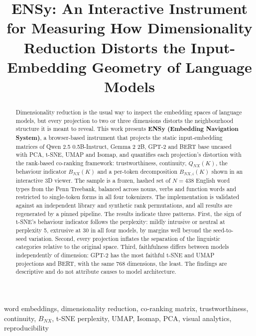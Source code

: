 \documentclass[conference,a4paper]{IEEEtran}
\begin{document}
\title{ENSy: An Interactive Instrument for Measuring How Dimensionality
Reduction Distorts the Input-Embedding Geometry of Language Models}
\author{
}
\maketitle

\begin{abstract}
Dimensionality reduction is the usual way to inspect the embedding
spaces of language models, but every projection to two or three
dimensions distorts the neighbourhood structure it is meant to reveal.
This work presents \textbf{ENSy (Embedding Navigation System)}, a
browser-based instrument that projects the static input-embedding
matrices of Qwen 2.5 0.5B-Instruct, Gemma 2 2B, GPT-2 and BERT base
uncased with PCA, t-SNE, UMAP and Isomap, and quantifies each
projection's distortion with the rank-based co-ranking framework:
trustworthiness, continuity, \(Q_{NX}(K)\), the behaviour indicator
\(B_{NX}(K)\) and a per-token decomposition \(B_{NX,i}(K)\) shown in an
interactive 3D viewer. The sample is a frozen, hashed set of \(N=438\)
English word types from the Penn Treebank, balanced across nouns, verbs
and function words and restricted to single-token forms in all four
tokenizers. The implementation is validated against an independent
library and synthetic rank permutations, and all results are regenerated
by a pinned pipeline. The results indicate three patterns. First, the
sign of t-SNE's behaviour indicator follows the perplexity: mildly
intrusive or neutral at perplexity 5, extrusive at 30 in all four
models, by margins well beyond the seed-to-seed variation. Second, every
projection inflates the separation of the linguistic categories relative
to the original space. Third, faithfulness differs between models
independently of dimension: GPT-2 has the most faithful t-SNE and UMAP
projections and BERT, with the same 768 dimensions, the least. The
findings are descriptive and do not attribute causes to model
architecture.
\end{abstract}
\begin{IEEEkeywords}
word embeddings, dimensionality reduction, co-ranking matrix,
trustworthiness, continuity, \(B_{NX}\), t-SNE perplexity, UMAP, Isomap,
PCA, visual analytics, reproducibility
\end{IEEEkeywords}
\end{document}
